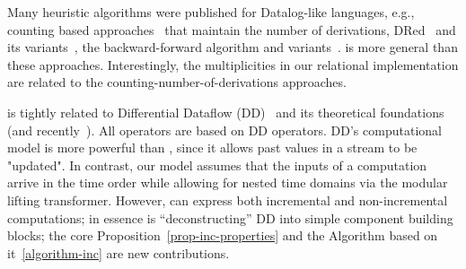 Many heuristic algorithms were published for Datalog-like languages, e.g., 
counting based approaches~\cite{Dewan-iis92,motik-aaai15} that maintain the number of derivations,
DRed~\cite{gupta-sigmod93} and its variants~\cite{Ceri-VLDB91,Wolfson-sigmod91,%
Staudt-vldb96,Kotowski-rr11,Lu-sigmod95,Apt-sigmod87}, the backward-forward algorithm and variants~\cite{motik-aaai15,
Harrison-wdd92,motik-ai19}.  \dbsp is more general than these approaches.  
Interestingly, the \zrs multiplicities in our relational implementation 
are related to the counting-number-of-derivations approaches.

\dbsp is tightly related to Differential Dataflow (DD)~\cite{mcsherry-cidr13, murray-sosp13}
and its theoretical foundations~\cite{abadi-fossacs15} (and recently~\cite{mchserry-vldb20,chothia-vldb16}).
All \dbsp operators are based on DD operators.  DD's computational model is more powerful than
\dbsp, since it allows past values in a stream to be "updated".
In contrast, our model assumes that the inputs of a computation arrive in the time order while allowing 
for nested time domains via the modular lifting transformer.  However, \dbsp can express both
incremental and non-incremental computations; in essence \dbsp is ``deconstructing'' DD into 
simple component building blocks; the core Proposition~\ref{prop-inc-properties} and
the Algorithm based on it~\ref{algorithm-inc} are new contributions.

